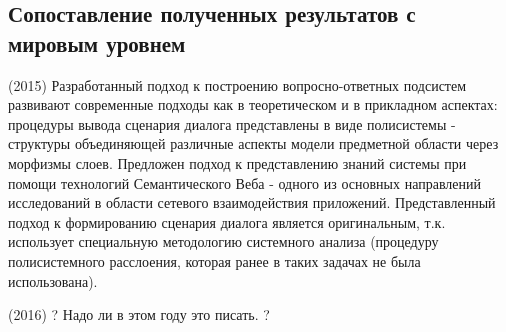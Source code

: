 \documentclass[12pt,a4paper]{ltxdoc}
\begin{document}
\subsection{Сопоставление полученных результатов с мировым уровнем}
(2015) Разработанный подход к построению вопросно-ответных подсистем развивают современные подходы как в теоретическом и в прикладном аспектах: процедуры вывода сценария диалога представлены в виде полисистемы - структуры объединяющей различные аспекты модели предметной области через морфизмы слоев. Предложен подход к представлению знаний системы при помощи технологий Семантического Веба - одного из основных направлений исследований в области сетевого взаимодействия приложений. Представленный подход к формированию сценария диалога является оригинальным, т.к. использует специальную методологию системного анализа (процедуру полисистемного расслоения, которая ранее в таких задачах не была использована).

(2016) ? Надо ли в этом году это писать. ?
\end{document}
